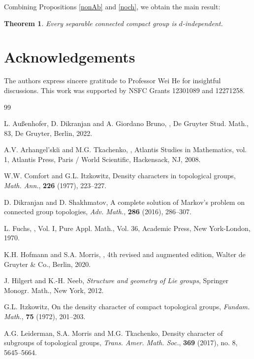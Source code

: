 \documentclass[12pt]{amsart}
\newtheorem{theorem}{Theorem}[section]
\theoremstyle{definition}
\theoremstyle{remark}
\begin{document}
Combining Propositions \ref{nonAb} and \ref{noch}, we obtain the main result:
\begin{theorem}
	Every separable connected compact group is $d$-independent.
\end{theorem}


\section*{Acknowledgements}
The authors express sincere gratitude to Professor Wei He for insightful discussions. This work was supported by NSFC Grants 12301089 and 12271258.
\begin{thebibliography}{99}

L. Außenhofer, D. Dikranjan and A. Giordano Bruno,  
, 
\newblock De Gruyter Stud. Math., 83, De Gruyter, Berlin, 2022.

A.V. Arhangel{'}ski\u{\i} and M.G. Tkachenko, 
,
\newblock Atlantis Studies in Mathematics, vol. 1, Atlantis Press, Paris / World Scientific, Hackensack, NJ, 2008.

W.W. Comfort and G.L. Itzkowitz, 
\newblock Density characters in topological groups,
\newblock \emph{Math. Ann.}, \textbf{226} (1977), 223--227.

D. Dikranjan and D. Shakhmatov,  
\newblock A complete solution of Markov's problem on connected group topologies, 
\newblock \emph{Adv. Math.}, \textbf{286} (2016), 286--307.

L. Fuchs, 
, Vol. I, Pure Appl. Math., Vol. 36, Academic Press, New York-London, 1970.

K.H. Hofmann and S.A. Morris,
,
\newblock 4th revised and augmented edition, Walter de Gruyter \& Co., Berlin, 2020.

J. Hilgert and K.-H. Neeb, 
\newblock \emph{Structure and geometry of Lie groups}, 
\newblock Springer Monogr. Math., New York, 2012.

G.L. Itzkowitz, 
\newblock On the density character of compact topological groups, 
\newblock \emph{Fundam. Math.}, \textbf{75} (1972), 201--203.

A.G. Leiderman, S.A. Morris and M.G. Tkachenko,
\newblock Density character of subgroups of topological groups,
\newblock \emph{Trans. Amer. Math. Soc.}, \textbf{369} (2017), no. 8, 5645--5664.


\end{thebibliography}
\end{document}
